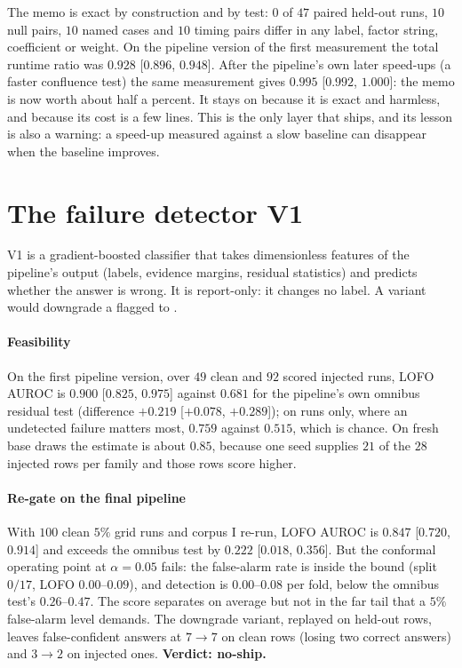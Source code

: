 The memo is exact by construction and by test: $0$ of $47$ paired held-out runs, $10$ null pairs, $10$ named cases and $10$ timing
pairs differ in any label, factor string, coefficient or weight. On the pipeline version of the first measurement the total runtime ratio
was $0.928$ [$0.896$, $0.948$]. After the pipeline's own later speed-ups (a faster confluence test) the same measurement gives $0.995$ [$0.992$, $1.000$]:
the memo is now worth about half a percent. It stays on because it is exact and harmless, and because its cost is a few lines.
This is the only layer that ships, and its lesson is also a warning: a speed-up measured against a slow baseline can disappear when the baseline improves.

\section{The failure detector V1}\label{sec:v1}
V1 is a gradient-boosted classifier that takes dimensionless features of the pipeline's output (labels, evidence margins,
residual statistics) and predicts whether the answer is wrong. It is report-only: it changes no label. A variant would downgrade
a flagged \FC{} to \UND.

\paragraph{Feasibility} On the first pipeline version, over $49$ clean and $92$ scored injected runs, LOFO AUROC is $0.900$ [$0.825$, $0.975$] against
$0.681$ for the pipeline's own omnibus residual test (difference $+0.219$ [$+0.078$, $+0.289$]); on \FC{} runs only, where an undetected failure
matters most, $0.759$ against $0.515$, which is chance. On fresh base draws the estimate is about $0.85$, because one seed supplies $21$ of the
$28$ injected rows per family and those rows score higher.

\paragraph{Re-gate on the final pipeline} With $100$ clean $5\%$ grid runs and corpus I re-run, LOFO AUROC is $0.847$ [$0.720$, $0.914$]
and exceeds the omnibus test by $0.222$ [$0.018$, $0.356$]. But the conformal operating point at $\alpha=0.05$ fails: the false-alarm rate is inside
the bound (split $0/17$, LOFO $0.00$--$0.09$), and detection is $0.00$--$0.08$ per fold, below the omnibus test's $0.26$--$0.47$. The score
separates on average but not in the far tail that a $5\%$ false-alarm level demands. The downgrade variant, replayed on held-out rows,
leaves false-confident answers at $7\to7$ on clean rows (losing two correct answers) and $3\to2$ on injected ones. \textbf{Verdict: no-ship.}

